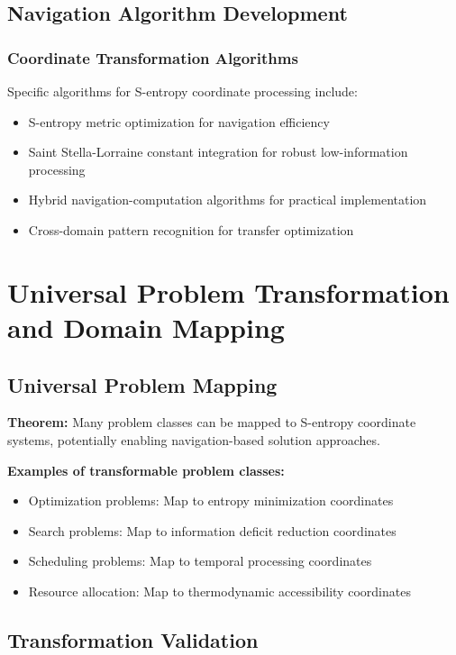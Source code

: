 \documentclass[11pt]{article}
\theoremstyle{definition}
\theoremstyle{remark}
\begin{document}
\subsection{Navigation Algorithm Development}

\subsubsection{Coordinate Transformation Algorithms}

Specific algorithms for S-entropy coordinate processing include:

\begin{itemize}
\item S-entropy metric optimization for navigation efficiency
\item Saint Stella-Lorraine constant integration for robust low-information processing
\item Hybrid navigation-computation algorithms for practical implementation
\item Cross-domain pattern recognition for transfer optimization
\end{itemize}

\section{Universal Problem Transformation and Domain Mapping}

\subsection{Universal Problem Mapping}

\textbf{Theorem:} Many problem classes can be mapped to S-entropy coordinate systems, potentially enabling navigation-based solution approaches.

\textbf{Examples of transformable problem classes:}
\begin{itemize}
\item Optimization problems: Map to entropy minimization coordinates
\item Search problems: Map to information deficit reduction coordinates
\item Scheduling problems: Map to temporal processing coordinates
\item Resource allocation: Map to thermodynamic accessibility coordinates
\end{itemize}

\subsection{Transformation Validation}
\end{document}
